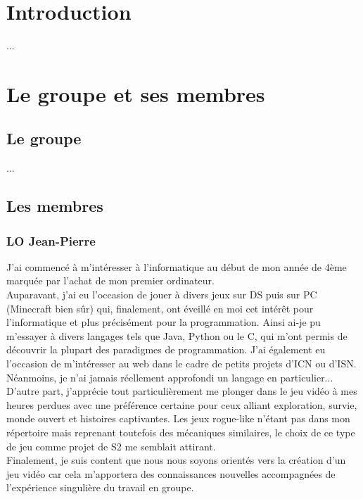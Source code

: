 \documentclass{article}
\title{
    \textbf{ \begin{center} \Huge Cahier des charges \end{center} }
    \textrm{ \underline{Groupe:} Sépanou }
}
\author{
    LO Jean-Pierre | MICHALON Loïc \and
    MICHOT Maxence | TCHEKACHEV David
}
\date{Janvier 2021}
\begin{document}
\maketitle

\pagebreak

\renewcommand*\contentsname{\textbf{\Huge Sommaire \newline}}
\large \tableofcontents

\pagebreak
\normalsize
\section{Introduction}

...

\pagebreak

\section{Le groupe et ses membres}

\subsection{Le groupe}

...

\subsection{Les membres}

\subsubsection{LO Jean-Pierre}

J'ai commencé à m'intéresser à l'informatique au début de mon année de 4ème marquée par l'achat de mon premier ordinateur.\\
Auparavant, j'ai eu l'occasion de jouer à divers jeux sur DS puis sur PC (Minecraft bien sûr) qui, finalement, ont éveillé en moi cet intérêt pour l'informatique et plus précisément pour la programmation.
Ainsi ai-je pu m'essayer à divers langages tels que Java, Python ou le C, qui m'ont permis de découvrir la plupart des paradigmes de programmation. J'ai également eu l'occasion de m'intéresser au web dans le cadre de petits projets d'ICN ou d'ISN. \\
Néanmoins, je n'ai jamais réellement approfondi un langage en particulier... \\
D'autre part, j'apprécie tout particulièrement me plonger dans le jeu vidéo à mes heures perdues avec une préférence certaine pour ceux alliant exploration, survie, monde ouvert et histoires captivantes. Les jeux rogue-like n'étant pas dans mon répertoire mais reprenant toutefois des mécaniques similaires, le choix de ce type de jeu comme projet de S2 me semblait attirant. \\
Finalement, je suis content que nous nous soyons orientés vers la création d'un jeu vidéo car cela m'apportera des connaissances nouvelles accompagnées de l'expérience singulière du travail en groupe.
\end{document}
